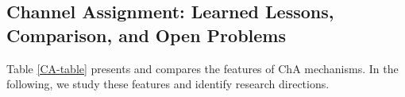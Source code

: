 %






\subsection{Channel Assignment: Learned Lessons, Comparison, and Open Problems}
\label{ChAProblems}
Table \ref{CA-table} presents and compares the features of ChA mechanisms.
In the following, we study these features and identify research directions.


